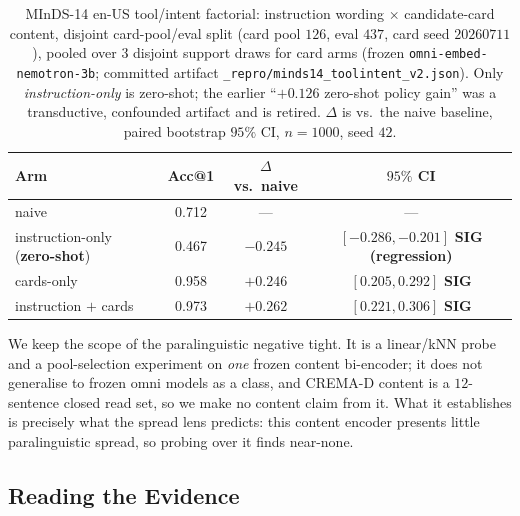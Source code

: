 \begin{table}[t]
\centering
\caption{MInDS-14 en-US tool/intent factorial: instruction wording $\times$ candidate-card content, disjoint card-pool/eval split (card pool $126$, eval $437$, card seed $20260711$), pooled over $3$ disjoint support draws for card arms (frozen \texttt{omni-embed-nemotron-3b}; committed artifact \texttt{\_repro/minds14\_toolintent\_v2.json}). Only \emph{instruction-only} is zero-shot; the earlier ``$+0.126$ zero-shot policy gain'' was a transductive, confounded artifact and is retired. $\Delta$ is vs.\ the naive baseline, paired bootstrap $95\%$ CI, $n{=}1000$, seed $42$.}
\label{tab:content}
\begin{tabular}{lccc}
\toprule
Arm & Acc@1 & $\Delta$ vs.\ naive & $95\%$ CI \\
\midrule
naive                                   & 0.712 & --- & --- \\
instruction-only (\textbf{zero-shot})   & 0.467 & $-0.245$ & $[-0.286,-0.201]$ \textbf{SIG (regression)} \\
cards-only                              & 0.958 & $+0.246$ & $[0.205,0.292]$ \textbf{SIG} \\
instruction $+$ cards                   & 0.973 & $+0.262$ & $[0.221,0.306]$ \textbf{SIG} \\
\bottomrule
\end{tabular}
\end{table}

We keep the scope of the paralinguistic negative tight. It is a linear/kNN probe and a pool-selection experiment on \emph{one} frozen content bi-encoder; it does not generalise to frozen omni models as a class, and CREMA-D content is a $12$-sentence closed read set, so we make no content claim from it. What it establishes is precisely what the spread lens predicts: this content encoder presents little paralinguistic spread, so probing over it finds near-none.

\subsection{Reading the Evidence}
\label{sec:res:reading}


